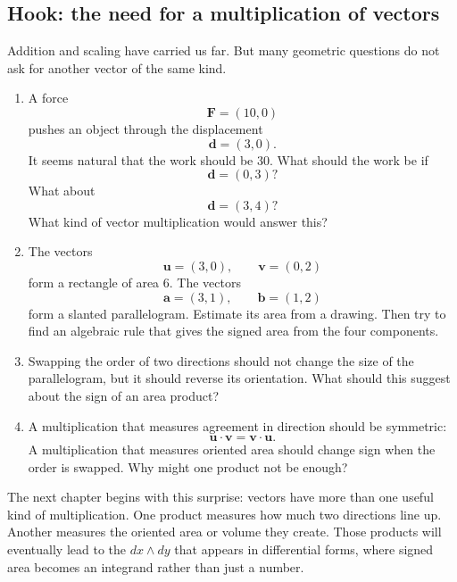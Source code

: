 \subsection{Hook: the need for a multiplication of vectors}

Addition and scaling have carried us far.  But many geometric questions do not ask
for another vector of the same kind.

\begin{enumerate}
    \item A force
    \[
        \mathbf F=(10,0)
    \]
    pushes an object through the displacement
    \[
        \mathbf d=(3,0).
    \]
    It seems natural that the work should be \(30\).  What should the work be if
    \[
        \mathbf d=(0,3)?
    \]
    What about
    \[
        \mathbf d=(3,4)?
    \]
    What kind of vector multiplication would answer this?

    \item The vectors
    \[
        \mathbf u=(3,0),\qquad \mathbf v=(0,2)
    \]
    form a rectangle of area \(6\).  The vectors
    \[
        \mathbf a=(3,1),\qquad \mathbf b=(1,2)
    \]
    form a slanted parallelogram.  Estimate its area from a drawing.  Then try to
    find an algebraic rule that gives the signed area from the four components.

    \item Swapping the order of two directions should not change the size of the
    parallelogram, but it should reverse its orientation.  What should this suggest about
    the sign of an area product?

    \item A multiplication that measures agreement in direction should be symmetric:
    \[
        \mathbf u\cdot\mathbf v=\mathbf v\cdot\mathbf u.
    \]
    A multiplication that measures oriented area should change sign when the order is
    swapped.  Why might one product not be enough?
\end{enumerate}

The next chapter begins with this surprise: vectors have more than one useful kind of
multiplication.  One product measures how much two directions line up.  Another
measures the oriented area or volume they create.  Those products will eventually lead
to the \(dx\wedge dy\) that appears in differential forms, where signed area becomes an
integrand rather than just a number.